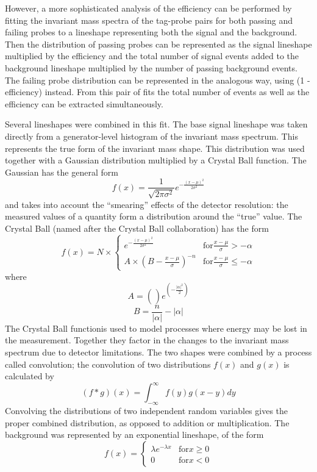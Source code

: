 However, a more sophisticated analysis of the efficiency can 
be performed by fitting the invariant mass spectra of the
tag-probe pairs for both passing and failing probes to a 
lineshape representing both the signal and the background.  
Then the distribution of passing probes can be represented as 
the signal lineshape multiplied by the efficiency and the
total number of signal events added to the background lineshape 
multiplied by the number of passing background events.  
The failing probe distribution can be represented in the 
analogous way, using (1 - efficiency) instead.  
From this pair of fits the total number of events as well as 
the efficiency can be extracted simultaneously.  

Several lineshapes were combined in this fit.  
The base signal lineshape was taken directly from a generator-level 
histogram of the \Zee invariant mass spectrum.  
This represents the true form of the invariant mass shape.  
This distribution was used together with a Gaussian distribution 
multiplied by a Crystal Ball function.  
The Gaussian has the general form 
\[
f(x) = \frac{1}{\sqrt{2\pi\sigma^2}} e^{-\frac{(x-\mu)^2}{2\sigma^2}}
\]
and takes into account the ``smearing'' effects 
of the detector resolution: 
the measured values of a quantity form a distribution 
around the ``true'' value.  
The Crystal Ball (named after the Crystal Ball collaboration) has the form
\[
f(x) = N \times 
\begin{cases}
e^{-\frac{(x-\mu)^2}{2\sigma^2}} & \text{for} \frac{x-\mu}{\sigma} > -\alpha \\
A \times \left(B - \frac{x-\mu}{\sigma} \right)^{-n} & \text{for} \frac{x-\mu}{\sigma} \leq -\alpha
\end{cases}
\]
where
\[
A = \left( \frac{}{} \right) e^{\left( -\frac{|\alpha|^2}{2} \right)}
\]
\[
B = \frac{n}{|\alpha|} - |\alpha|
\]
The Crystal Ball functionis used to model processes where energy may be lost 
in the measurement.  
Together they factor in the changes to the invariant mass 
spectrum due to detector limitations.  
The two shapes were combined by a process called convolution; 
the convolution of two distributions $f(x)$ and $g(x)$ is calculated by 
\[
(f * g)(x) = \int_{-\infty}^{\infty} f(y) g(x - y) dy
\]
Convolving the distributions of two independent random variables 
gives the proper combined distribution, 
as opposed to addition or multiplication.  
The background was represented by an exponential lineshape, of the form 
\[
f(x) = 
\begin{cases}
\lambda e^{-\lambda x} & \text{for} x \geq 0 \\
0 & \text{for} x < 0
\end{cases}
\]
